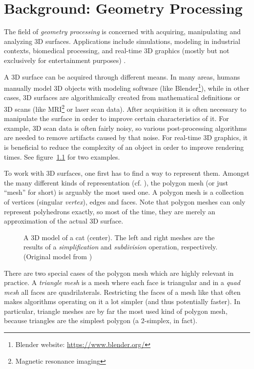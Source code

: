 \newlength{\origtabcolsep}
\setlength{\origtabcolsep}{\tabcolsep}


\chapter{Background: Geometry Processing}
\label{chap:background-geometry-processing}

The field of \emph{geometry processing} is concerned with acquiring, manipulating and analyzing 3D surfaces.
Applications include simulations, modeling in industrial contexts, biomedical processing, and real-time 3D graphics (mostly but not exclusively for entertainment purposes) \cite{wikigeometryproc, botsch2010polygon}.

A 3D surface can be acquired through different means.
In many areas, humans manually model 3D objects with modeling software (like Blender\footnote{Blender website: \url{https://www.blender.org/}}), while in other cases, 3D surfaces are algorithmically created from mathematical definitions or 3D scans (like MRI\footnote{Magnetic resonance imaging} or laser scan data).
After acquisition it is often necessary to manipulate the surface in order to improve certain characteristics of it.
For example, 3D scan data is often fairly noisy, so various post-processing algorithms are needed to remove artifacts caused by that noise.
For real-time 3D graphics, it is beneficial to reduce the complexity of an object in order to improve rendering times.
See figure~\ref{fig:cat-algo} for two examples.

To work with 3D surfaces, one first has to find a way to represent them.
Amongst the many different kinds of representation (cf. \cite[Chapter~1]{botsch2010polygon}), the polygon mesh (or just \enquote{mesh} for short) is arguably the most used one.
A polygon mesh is a collection of vertices (singular \emph{vertex}), edges and faces.
Note that polygon meshes can only represent polyhedrons exactly, so most of the time, they are merely an approximation of the actual 3D surface.

\begin{figure}[b]
  
  \caption{A 3D model of a cat (center).
  The left and right meshes are the results of a \emph{simplification} and \emph{subdivision} operation, respectively.
  (Original model from \cite{catmodel})}
  \label{fig:cat-algo}
\end{figure}

There are two special cases of the polygon mesh which are highly relevant in practice.
A \emph{triangle mesh} is a mesh where each face is triangular and in a \emph{quad mesh} all faces are quadrilaterals.
Restricting the faces of a mesh like that often makes algorithms operating on it a lot simpler (and thus potentially faster).
In particular, triangle meshes are by far the most used kind of polygon mesh, because triangles are the simplest polygon (a 2-simplex, in fact).

